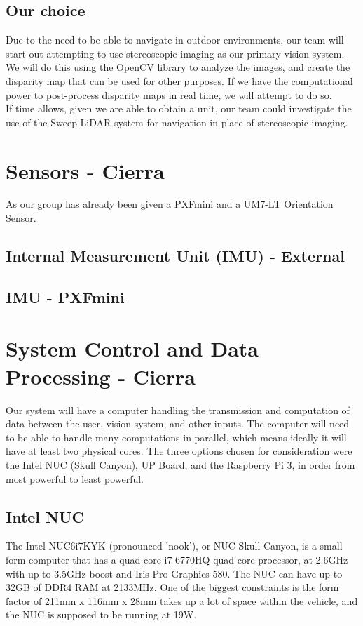 \documentclass[compsoc,draftclsnofoot,onecolumn,10pt]{IEEEtran}
\begin{document}
\subsection{Our choice}
Due to the need to be able to navigate in outdoor environments, our team will start out attempting to use stereoscopic imaging as our primary vision system. We will do this using the OpenCV library to analyze the images, and create the disparity map that can be used for other purposes. If we have the computational power to post-process disparity maps in real time, we will attempt to do so. \\
If time allows, given we are able to obtain a unit, our team could investigate the use of the Sweep LiDAR system for navigation in place of stereoscopic imaging. 

\section{Sensors - Cierra}
As our group has already been given a PXFmini and a UM7-LT Orientation Sensor. 
\subsection{Internal Measurement Unit (IMU) - External}
\subsection{IMU - PXFmini}


\section{System Control and Data Processing - Cierra}
Our system will have a computer handling the transmission and computation of data between the user, vision system, and other inputs. 
The computer will need to be able to handle many computations in parallel, which means ideally it will have at least two physical cores. 
The three options chosen for consideration were the Intel NUC (Skull Canyon), UP Board, and the Raspberry Pi 3, in order from most powerful to least powerful. 

\subsection{Intel NUC}
The Intel NUC6i7KYK (pronounced 'nook'), or NUC Skull Canyon, is a small form computer that has a quad core i7 6770HQ quad core processor, at 2.6GHz with up to 3.5GHz boost and Iris Pro Graphics 580. 
The NUC can have up to 32GB of DDR4 RAM at 2133MHz. 
One of the biggest constraints is the form factor of 211mm x 116mm x 28mm takes up a lot of space within the vehicle, and the NUC is supposed to be running at 19W. 
\end{document}
